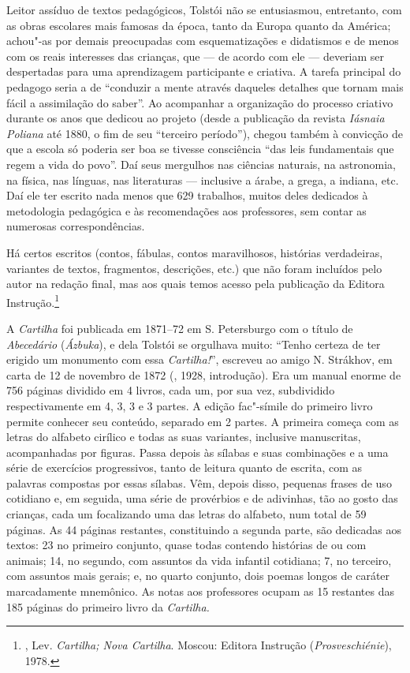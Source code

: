 Leitor assíduo de textos pedagógicos, Tolstói não se entusiasmou,
entretanto, com as obras escolares mais famosas da época, tanto da
Europa quanto da América; achou"-as por demais preocupadas com
esquematizações e didatismos e de menos com os reais interesses
das crianças, que --- de acordo com ele --- deveriam ser
despertadas para uma aprendizagem participante e criativa.
A tarefa principal do pedagogo seria a de ``conduzir a mente
através daqueles detalhes que tornam mais fácil a assimilação
do saber''. Ao acompanhar a organização do processo criativo
durante os anos que dedicou ao projeto (desde a publicação da
revista \emph{Iásnaia Poliana} até 1880, o fim de seu ``terceiro
período''), chegou também à convicção de que a escola só poderia
ser boa se tivesse consciência ``das leis fundamentais que regem
a vida do povo''. Daí seus mergulhos nas ciências naturais, na
astronomia, na física, nas línguas, nas literaturas --- inclusive
a árabe, a grega, a indiana, etc. Daí ele ter escrito nada menos
que 629 trabalhos, muitos deles dedicados à metodologia
pedagógica e às recomendações aos professores, sem contar
as numerosas correspondências. 

Há certos escritos (contos, fábulas, contos maravilhosos, histórias verdadeiras, variantes de textos, fragmentos, descrições, etc.) que não foram incluídos pelo autor na redação final, mas aos quais temos acesso pela publicação da Editora Instrução.\footnote{, Lev. \emph{Cartilha; Nova Cartilha}. Moscou: Editora Instrução (\emph{Prosveschiénie}), 1978.}

A \emph{Cartilha} foi publicada em 1871--72 em S. Petersburgo com o título
de \emph{Abecedário} (\emph{Ázbuka}), e dela Tolstói se
orgulhava muito: ``Tenho certeza de ter erigido um monumento
com essa \emph{Cartilha!}'', escreveu ao amigo N. Strákhov, em
carta de 12 de novembro de 1872 (, 1928,
introdução). Era um manual enorme de 756 páginas dividido em
4 livros, cada um, por sua vez, subdividido respectivamente em
4, 3, 3 e 3 partes. A edição fac"-símile do primeiro livro permite
conhecer seu conteúdo, separado em 2 partes. A primeira começa
com as letras do alfabeto cirílico e todas as suas variantes,
inclusive   manuscritas, acompanhadas por figuras. Passa depois
às sílabas e suas combinações e a uma série de exercícios
progressivos, tanto de leitura quanto de escrita, com as
palavras compostas por essas sílabas. Vêm, depois disso,
pequenas frases de uso cotidiano e, em seguida, uma série de
provérbios e de adivinhas, tão ao gosto das crianças, cada um
focalizando uma das letras do alfabeto, num total de 59 páginas.
As 44 páginas restantes, constituindo a segunda parte, são
dedicadas aos textos: 23 no primeiro conjunto, quase todas
contendo histórias de ou com animais; 14, no segundo, com
assuntos da vida infantil cotidiana; 7, no terceiro, com
assuntos mais gerais; e, no quarto conjunto, dois poemas
longos de caráter marcadamente mnemônico. As notas aos
professores ocupam as 15 restantes das 185 páginas do
primeiro livro da \emph{Cartilha.}

